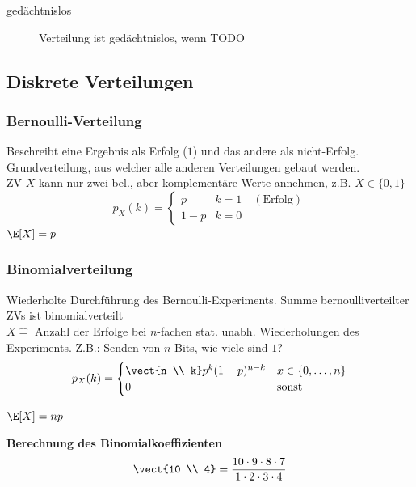 \begin{description}
    \item[gedächtnislos] Verteilung ist gedächtnislos, wenn TODO
\end{description}

\subsection{Diskrete Verteilungen}
\begin{sectionbox}
    \subsubsection{Bernoulli-Verteilung}
    Beschreibt eine Ergebnis als Erfolg ($1$) und das andere als nicht-Erfolg. Grundverteilung, aus welcher alle anderen Verteilungen gebaut werden. \\
    ZV $X$ kann nur zwei bel., aber komplementäre Werte annehmen, z.B. $X\in\{0,1\}$ \begin{equation*}
        p_X(k) = \begin{cases}
            p   & k=1 \quad (\text{Erfolg}) \\
            1-p & k=0
        \end{cases}
    \end{equation*}
    $\E[X] = p$
\end{sectionbox}

\begin{sectionbox}
    \subsubsection{Binomialverteilung}
    Wiederholte Durchführung des Bernoulli-Experiments. Summe bernoulliverteilter ZVs ist binomialverteilt \\
    $X \widehat{=}$ Anzahl der Erfolge bei $n$-fachen stat. unabh. Wiederholungen des Experiments. Z.B.: Senden von $n$ Bits, wie viele sind $1$?
    \begin{equation*}
        p_X(k) = \begin{cases}
            \vect{n \\ k} p^k (1-p)^{n-k} & x\in\{0,\dots,n\} \\
            0                             & \text{sonst}
        \end{cases}
    \end{equation*}

    $\E[X] = np$

    \textbf{Berechnung des Binomialkoeffizienten}
    \begin{equation*}
        \vect{10 \\ 4} = \frac{10\cdot 9 \cdot 8\cdot 7}{1\cdot 2\cdot 3\cdot 4}
    \end{equation*}
\end{sectionbox}

